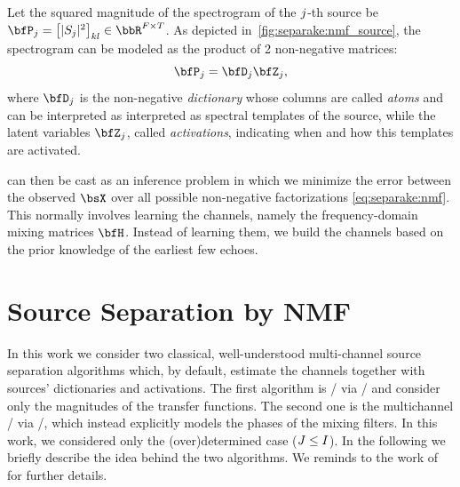 \mynewline
Let the squared magnitude of the spectrogram of the $j$-th source be $\mP_\idxSrc = \klist{\powerOf{\SRC_\idxSrc}}_{kl} \in \bbR^{F\times T}$.
As depicted in~\cref{fig:separake:nmf_source}, the spectrogram can be modeled as the product of 2 non-negative matrices:
\begin{equation}
    \label{eq:separake:nmf}
    \mP_\idxSrc =  \mD_\idxSrc \mZ_\idxSrc,
\end{equation}
where $\mD_\idxSrc$ is the non-negative \textit{dictionary} whose columns are called \textit{atoms} and can be interpreted as interpreted as spectral templates of the source,
while the latent variables $\mZ_\idxSrc$, called \textit{activations}, indicating when and how this templates are activated.

 can then be cast as an inference problem in which we minimize the error between the observed $\MICS$ over all possible non-negative factorizations \eqref{eq:separake:nmf}.
This normally involves learning the channels, namely the frequency-domain mixing matrices $\FLTSS$.
Instead of learning them, we build the channels based on the prior knowledge of the earliest few echoes.

\section{Source Separation by NMF}
In this work we consider two classical, well-understood multi-channel source separation algorithms which, by default, estimate the channels together with sources' dictionaries and activations.
The first algorithm is \NMFdef/ via \MUdef/ and consider only the magnitudes of the transfer functions.
The second one is the multichannel \NMF/ via \EMdef/, which instead explicitly models the phases of the mixing filters.
In this work, we considered only the (over)determined case ($J \leq I$).
In the following we briefly describe the idea behind the two algorithms.
We reminds to the work of~ for further details.

